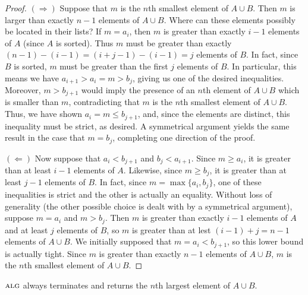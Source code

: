 \documentclass[11pt]{article}
\newcommand{\alg}{\textsc{alg}}
\begin{document}
\begin{proof}
  $(\Rightarrow)$ Suppose that $m$ is the $n$th smallest element of $A \cup B$.
  Then $m$ is larger than exactly $n - 1$ elements of $A \cup B$.
  Where can these elements possibly be located in their lists?
  If $m = a_i$, then $m$ is greater than exactly $i - 1$ elements of $A$ (since $A$ is sorted).
  Thus $m$ must be greater than exactly $(n - 1) - (i - 1) = (i + j - 1) - (i - 1) = j$ elements of $B$.
  In fact, since $B$ is sorted, $m$ must be greater than the first $j$ elements of $B$.
  In particular, this means we have $a_{i + 1} > a_i = m > b_j$, giving us one of the desired inequalities.
  Moreover, $m > b_{j+1}$ would imply the presence of an $n$th element of $A \cup B$ which is smaller than $m$, contradicting that $m$ is the $n$th smallest element of $A \cup B$.
  Thus, we have shown $a_i = m \leq b_{j+1}$, and, since the elements are distinct, this inequality must be strict, as desired.
  A symmetrical argument yields the same result in the case that $m = b_j$, completing one direction of the proof.

  $(\Leftarrow)$ Now suppose that $a_i < b_{j+1}$ and $b_j < a_{i+1}$.
  Since $m \geq a_i$, it is greater than at least $i - 1$ elements of $A$.
  Likewise, since $m \geq b_j$, it is greater than at least $j - 1$ elements of $B$.
  In fact, since $m = \max\{a_i, b_j\}$, one of these inequalities is strict and the other is actually an equality.
  Without loss of generality (the other possible choice is dealt with by a symmetrical argument), suppose $m = a_i$ and $m > b_j$.
  Then $m$ is greater than exactly $i - 1$ elements of $A$ and at least $j$ elements of $B$, so $m$ is greater than at lest $(i - 1) + j = n - 1$ elements of $A \cup B$.
  We initially supposed that $m = a_i < b_{j+1}$, so this lower bound is actually tight.
  Since $m$ is greater than exactly $n - 1$ elements of $A \cup B$, $m$ is the $n$th smallest element of $A \cup B$.
\end{proof}

 $\alg$ always terminates and returns the $n$th largest element of $A \cup B$.
\end{document}
